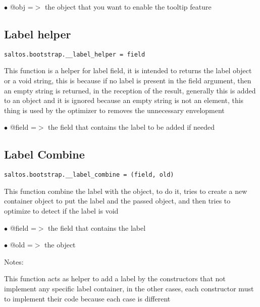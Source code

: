 \documentclass[a4paper]{book}
\begin{document}
\begin{compactitem}
\item[\color{myblue}$\bullet$] @obj =$>$ the object that you want to enable the tooltip feature
\end{compactitem}

\hypertarget{toc494}{}
\subsection{Label helper}

\begin{lstlisting}
saltos.bootstrap.__label_helper = field
\end{lstlisting}

This function is a helper for label field, it is intended to returns the
label object or a void string, this is because if no label is present in
the field argument, then an empty string is returned, in the reception
of the result, generally this is added to an object and it is ignored
because an empty string is not an element, this thing is used by the
optimizer to removes the unnecessary envelopment

\begin{compactitem}
\item[\color{myblue}$\bullet$] @field =$>$ the field that contains the label to be added if needed
\end{compactitem}

\hypertarget{toc495}{}
\subsection{Label Combine}

\begin{lstlisting}
saltos.bootstrap.__label_combine = (field, old)
\end{lstlisting}

This function combine the label with the object, to do it, tries to create a new
container object to put the label and the passed object, and then tries to optimize
to detect if the label is void

\begin{compactitem}
\item[\color{myblue}$\bullet$] @field =$>$ the field that contains the label
\item[\color{myblue}$\bullet$] @old   =$>$ the object
\end{compactitem}

Notes:

This function acts as helper to add a label by the constructors that not implement
any specific label container, in the other cases, each constructor must to implement
their code because each case is different
\end{document}
